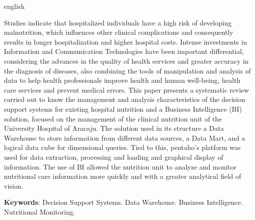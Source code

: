 \setlength{\absparsep}{18pt} %
\begin{resumo}[Abstract]
 \begin{otherlanguage*}{english}
   
Studies indicate that hospitalized individuals have a high risk of developing malnutrition, which influences other clinical complications and consequently results in longer hospitalization and higher hospital costs. 
Intense investments in Information and Communication Technologies have been important differential, considering the advances in the quality of health services and greater accuracy in the diagnosis of diseases, also combining the tools of manipulation and analysis of data to help health professionals improve health and human well-being, health care services and prevent medical errors. 
This paper presents a systematic review carried out to know the management and analysis characteristics of the decision support systems for existing hospital nutrition and a Business Intelligence (BI) solution, focused on the management of the clinical nutrition unit of the University Hospital of Aracaju. The solution used in its structure a Data Warehouse to store information from different data sources, a Data Mart, and a logical data cube for dimensional queries. 
Tied to this, pentaho's platform was used for data extraction, processing and loading and graphical display of information. The use of BI allowed the nutrition unit to analyze and monitor nutritional care information more quickly and with a greater analytical field of vision. 

   \vspace{\onelineskip}
 
   \noindent 
   \textbf{Keywords}: Decision Support Systems. Data Warehouse. Business Intelligence. Nutritional Monitoring.
 \end{otherlanguage*}
\end{resumo}